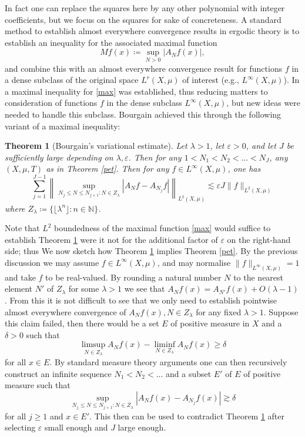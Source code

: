 \documentclass[12pt,a4paper,reqno]{amsart}
\numberwithin{equation}{section}
\theoremstyle{plain}
\newtheorem{theorem}{Theorem}[section]
\theoremstyle{definition}
\newcommand\N{\mathbb{N}}
\newcommand\eps{\varepsilon}
\begin{document}
In fact one can replace the squares here by any other polynomial with integer coefficients, but we focus on the squares for sake of concreteness.
A standard method to establish almost everywhere convergence results in ergodic theory is to establish an inequality for the associated maximal function
\begin{equation}\label{max}
 Mf(x) \coloneqq \sup_{N>0} |A_N f(x)|,
\end{equation}
and combine this with an almost everywhere convergence result for functions $f$ in a dense subclass of the original space $L^r(X,\mu)$ of interest (e.g., $L^\infty(X,\mu)$).  In \cite{ergodic} a maximal inequality for \eqref{max} was established, thus reducing matters to consideration of functions $f$ in the dense subclass $L^\infty(X,\mu)$, but new ideas were needed to handle this subclass.  Bourgain achieved this through the following variant of a maximal inequality:

\begin{theorem}[Bourgain's variational estimate]\label{bve}  Let $\lambda>1$, let $\eps>0$, and let $J$ be sufficiently large depending on $\lambda,\eps$.  Then for any $1 < N_1 < N_2 < \dots < N_J$, any $(X,\mu,T)$ as in Theorem \ref{pet}.  Then for any $f \in L^\infty(X,\mu)$, one has
$$ \sum_{j=1}^{J-1} \left\| \sup_{N_j \leq N \leq N_{j+1}: N \in Z_\lambda} |A_N f - A_{N_j} f| \right\|_{L^2(X,\mu)} \lesssim \eps J \|f\|_{L^2(X,\mu)}$$
where $Z_\lambda \coloneqq  \{ \lfloor \lambda^n\rfloor: n \in \N \}$.
\end{theorem}

Note that $L^2$ boundedness of the maximal function \eqref{max} would suffice to establish Theorem \ref{bve} were it not for the additional factor of $\eps$ on the right-hand side; thus 
We now sketch how Theorem \ref{bve} implies Theorem \ref{pet}.  By the previous discussion we may assume $f \in L^\infty(X,\mu)$, and may normalise $\|f\|_{L^\infty(X,\mu)} = 1$ and take $f$ to be real-valued.  By rounding a natural number $N$ to the nearest element $N'$ of $Z_\lambda$ for some $\lambda>1$ we see that $A_N f(x) = A_{N'} f(x) + O( \lambda-1)$.  From this it is not difficult to see that we only need to establish pointwise almost everywhere convergence of $A_N f(x), N \in Z_\lambda$ for any fixed $\lambda>1$.  Suppose this claim failed, then there would be a set $E$ of positive measure in $X$ and a $\delta>0$ such that
$$ \limsup_{N \in Z_\lambda} A_N f(x) - \liminf_{N \in Z_\lambda} A_N f(x) \geq \delta$$
for all $x \in E$.  By standard measure theory arguments one can then recursively construct an infinite sequence $N_1 < N_2 < \dots$ and a subset $E'$ of $E$ of positive measure such that
$$ \sup_{N_j \leq N \leq N_{j+1}: N \in Z_\lambda} |A_N f(x) - A_{N_j} f(x)| \gtrsim \delta$$
for all $j \geq 1$ and $x \in E'$.  This then can be used to contradict Theorem \ref{bve} after selecting $\eps$ small enough and $J$ large enough.
\end{document}
